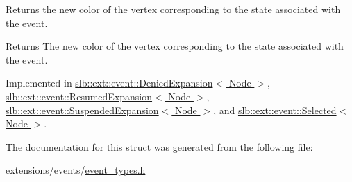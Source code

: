 Returns the new color of the vertex corresponding to the state associated with the event. 

\begin{DoxyReturn}{Returns}
The new color of the vertex corresponding to the state associated with the event. 
\end{DoxyReturn}


Implemented in \hyperlink{structslb_1_1ext_1_1event_1_1DeniedExpansion_a6f2aa3f5f67e00c2c30aebd472872eda}{slb\+::ext\+::event\+::\+Denied\+Expansion$<$ Node $>$}, \hyperlink{structslb_1_1ext_1_1event_1_1ResumedExpansion_afb9e4dc6fbff2578c6ea9fb2bf15203c}{slb\+::ext\+::event\+::\+Resumed\+Expansion$<$ Node $>$}, \hyperlink{structslb_1_1ext_1_1event_1_1SuspendedExpansion_a02b68e81e35985526168aab04b775478}{slb\+::ext\+::event\+::\+Suspended\+Expansion$<$ Node $>$}, and \hyperlink{structslb_1_1ext_1_1event_1_1Selected_aa00ff31fafc8dc707c316d46fbdd3b39}{slb\+::ext\+::event\+::\+Selected$<$ Node $>$}.



The documentation for this struct was generated from the following file\+:\begin{DoxyCompactItemize}
\item 
extensions/events/\hyperlink{event__types_8h}{event\+\_\+types.\+h}\end{DoxyCompactItemize}
